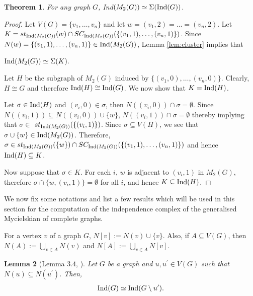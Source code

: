 \documentclass[12pt]{article}
\newtheorem{thm}{Theorem}
\newtheorem{lem}[thm]{Lemma}
\numberwithin{thm}{section}
\theoremstyle{definition}
\newcommand{\ind}{{\rm{Ind}}}
\begin{document}
  
 \begin{thm} \label{thm:requal2}
 	For any graph $G$, 
 	\ind$(M_2(G)) \simeq \Sigma (\ind(G))$. 
 	
 \end{thm}
\begin{proof}

Let $V(G) = \{v_1, \ldots, v_n\}$ and let $w = (v_1,2) = \ldots = (v_n, 2)$. Let $K= st_{\ind(M_2(G))}(w) \cap SC_{\ind(M_2(G))}(\{(v_1,1), \ldots, (v_n,1)\})$.  Since $N(w)=\{(v_1,1), \ldots, (v_n,1)\}\in \ind(M_2(G))$, Lemma \ref{lem:cluster} implies that 
  	\begin{center}
  $	\ind(M_2(G)) \simeq \Sigma (K).$
  \end{center}
  	
  Let $H$ be the subgraph of $M_2(G)$ induced by $\{(v_1, 0), \ldots, (v_n, 0)\}$. Clearly, $H \cong G$ and therefore $\ind(H) \cong \ind(G)$. We now show that $K = \ind(H)$.
    
   Let $\sigma \in \ind(H)$ and $(v_i,0) \in \sigma$, then $N((v_i,0)) \cap \sigma = \emptyset$. Since $N((v_i,1)) \subseteq N((v_i,0)) \cup \{w\}$,  $N((v_i,1)) \cap \sigma = \emptyset$ thereby implying that $\sigma \in $ $ st_{\ind(M_2(G))}(\{(v_i,1)\})$. Since $\sigma \subseteq V(H)$, we see that $\sigma \cup \{w\} \in \ind(M_2(G))$. Therefore, 
  	$\sigma \in st_{\ind(M_2(G))}(\{w\}) \cap SC_{\ind(M_2(G))}(\{(v_1,1), \ldots, (v_n,1)\})$ and hence $\ind(H) \subseteq K$.
  	
  	Now suppose that $\sigma \in K$. For each $i$, $w$ is adjacent to  $(v_i, 1)$ in $M_2(G)$, therefore $\sigma \cap \{w, (v_i,1)\} = \emptyset $ for all $i$, and hence $K \subseteq \ind(H)$.
  \end{proof}
 
  
    We now fix some notations and list a few  results which will be used in this section for the computation of the independence complex of the generalised Mycielskian of complete graphs. 
    
    For a vertex $v $ of a graph $G$, $N[v] := N(v) \cup \{v\}$. Also, if $A \subseteq V(G)$, then $N(A) :=\bigcup\limits_{v \in A} N(v)$ and $N[A] := \bigcup\limits_{v \in A} N[v]$.
    

 
\begin{lem}[Lemma $3.4$, \cite{ea1}]\label{lem:folding} 
  Let $G$ be a graph and $u, u^\prime \in V(G)$ such that $N(u)\subseteq N(u^\prime)$. Then, $$\ind(G) \simeq \ind(G\setminus u^\prime).$$
 \end{lem}
  
\end{document}
